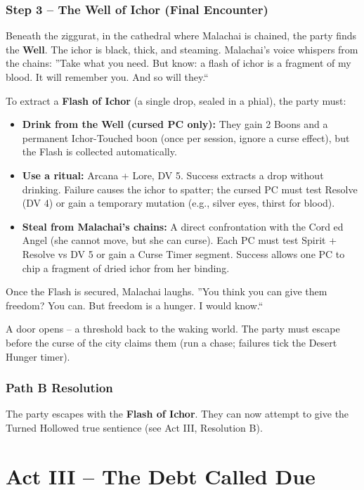 \documentclass[10pt,twoside]{book}
\begin{document}
\subsection{Step 3 -- The Well of Ichor (Final Encounter)}
Beneath the ziggurat, in the cathedral where Malachai is chained, the party finds the \textbf{Well}. The ichor is black, thick, and steaming. Malachai's voice whispers from the chains: ''Take what you need. But know: a flash of ichor is a fragment of my blood. It will remember you. And so will they.``

To extract a \textbf{Flash of Ichor} (a single drop, sealed in a phial), the party must:
\begin{itemize}
\item \textbf{Drink from the Well (cursed PC only):} They gain 2 Boons and a permanent Ichor-Touched boon (once per session, ignore a curse effect), but the Flash is collected automatically.
\item \textbf{Use a ritual:} Arcana + Lore, DV 5. Success extracts a drop without drinking. Failure causes the ichor to spatter; the cursed PC must test Resolve (DV 4) or gain a temporary mutation (e.g., silver eyes, thirst for blood).
\item \textbf{Steal from Malachai's chains:} A direct confrontation with the Cord ed Angel (she cannot move, but she can curse). Each PC must test Spirit + Resolve vs DV 5 or gain a Curse Timer segment. Success allows one PC to chip a fragment of dried ichor from her binding.
\end{itemize}

Once the Flash is secured, Malachai laughs. ''You think you can give them freedom? You can. But freedom is a hunger. I would know.``

A door opens -- a threshold back to the waking world. The party must escape before the curse of the city claims them (run a chase; failures tick the Desert Hunger timer).

\subsection{Path B Resolution}
The party escapes with the \textbf{Flash of Ichor}. They can now attempt to give the Turned Hollowed true sentience (see Act III, Resolution B).

\chapter{Act III -- The Debt Called Due}
\end{document}
